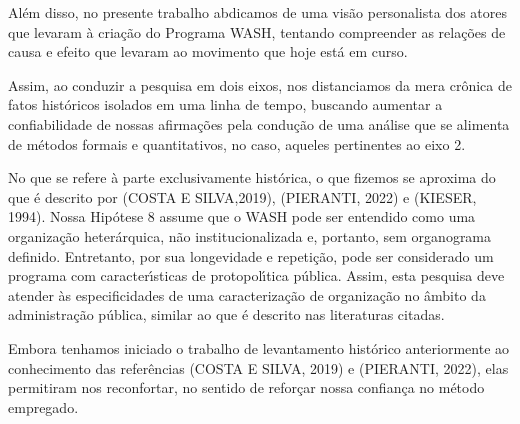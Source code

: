 \documentclass[
12pt,		%
openright,	%
twoside,  %
a4paper,			%
chapter=TITLE,		%
english,			%
french,				%
spanish,			%
brazil				%
]{USPSC-classe/USPSC}
\begin{document}
Al\'em disso, no presente trabalho abdicamos de uma vis\~ao personalista dos atores que levaram \`a cria\c{c}\~ao do Programa WASH, tentando compreender as rela\c{c}\~oes de causa e efeito que levaram ao movimento que hoje est\'a em curso.

















Assim, ao conduzir a pesquisa em dois eixos, nos distanciamos da mera cr\^onica de fatos hist\'oricos isolados em uma linha de tempo, buscando aumentar a confiabilidade de nossas afirma\c{c}\~oes pela condu\c{c}\~ao de uma an\'alise que se alimenta de m\'etodos formais e quantitativos, no caso, aqueles pertinentes ao eixo 2.

















No que se refere \`a parte exclusivamente hist\'orica, o que fizemos se aproxima do que \'e descrito por (COSTA E SILVA,2019), (PIERANTI, 2022) e (KIESER, 1994). Nossa Hip\'otese 8 assume que o WASH pode ser entendido como uma organiza\c{c}\~ao heter\'arquica, n\~ao institucionalizada e, portanto, sem organograma definido. Entretanto, por sua longevidade e repeti\c{c}\~ao, pode ser considerado um programa com caracter\'{\i}sticas de protopol\'{\i}tica p\'ublica. Assim, esta pesquisa deve atender \`as especificidades de uma caracteriza\c{c}\~ao de organiza\c{c}\~ao no \^ambito da administra\c{c}\~ao p\'ublica, similar ao que \'e descrito nas literaturas citadas.

















Embora tenhamos iniciado o trabalho de levantamento hist\'orico anteriormente ao conhecimento das refer\^encias (COSTA E SILVA, 2019) e (PIERANTI, 2022), elas permitiram nos reconfortar, no sentido de refor\c{c}ar nossa confian\c{c}a no m\'etodo empregado.
\end{document}
